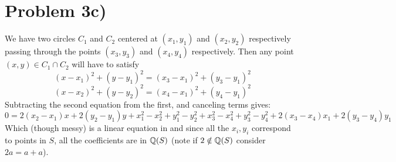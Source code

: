 \section*{Problem 3c)}
We have two circles $C_1$ and $C_2$ centered at $(x_1,y_1)$ and $(x_2,y_2)$ respectively passing through the points $(x_3,y_3)$ and $(x_4,y_4)$ respectively.
Then any point $(x,y)\in C_1\cap C_2$ will have to satisfy
\[(x-x_1)^2+(y-y_1)^2=(x_3-x_1)^2+(y_3-y_1)^2 \]
\[(x-x_2)^2+(y-y_2)^2=(x_4-x_1)^2+(y_4-y_1)^2 \]
Subtracting the second equation from the first, and canceling terms gives:
\[ 0 = 2(x_2-x_1)x+2(y_2-y_1)y + x_1^2 -x_2^2 + y_1^2-y_2^2 + x_3^2-x_4^2 + y_3^2-y_4^2 + 2(x_3-x_4)x_1+2(y_3-y_4)y_1 \]
Which (though messy) is a linear equation in and since all the $x_i,y_i$ correspond to points in $S$, all the coefficients are in $\mathbb{Q}(S)$ (note if $2\notin \mathbb{Q}(S)$ consider $2a=a+a$).
